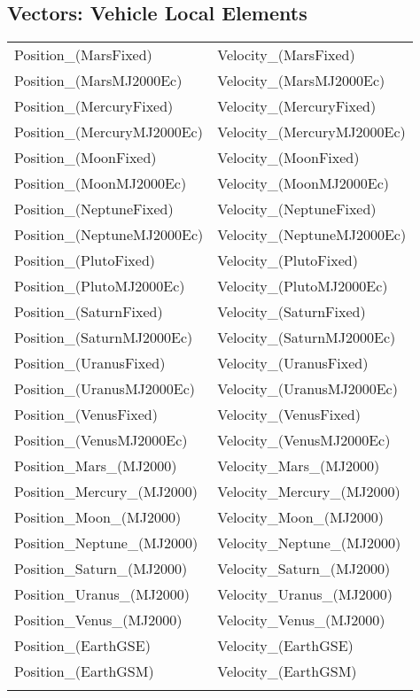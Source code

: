 \subsection{Vectors: Vehicle Local Elements}
\begin{table}[ht!]
\centering
    \begin{tabular}{ll}
    Position\_(MarsFixed) & Velocity\_(MarsFixed)\\
    Position\_(MarsMJ2000Ec) & Velocity\_(MarsMJ2000Ec)\\
    Position\_(MercuryFixed) & Velocity\_(MercuryFixed)\\
    Position\_(MercuryMJ2000Ec) & Velocity\_(MercuryMJ2000Ec)\\
    Position\_(MoonFixed) & Velocity\_(MoonFixed)\\
    Position\_(MoonMJ2000Ec) & Velocity\_(MoonMJ2000Ec)\\
    Position\_(NeptuneFixed) & Velocity\_(NeptuneFixed)\\
    Position\_(NeptuneMJ2000Ec) & Velocity\_(NeptuneMJ2000Ec)\\
    Position\_(PlutoFixed) & Velocity\_(PlutoFixed)\\
    Position\_(PlutoMJ2000Ec) & Velocity\_(PlutoMJ2000Ec)\\
    Position\_(SaturnFixed) & Velocity\_(SaturnFixed)\\
    Position\_(SaturnMJ2000Ec) & Velocity\_(SaturnMJ2000Ec)\\
    Position\_(UranusFixed) & Velocity\_(UranusFixed)\\
    Position\_(UranusMJ2000Ec) & Velocity\_(UranusMJ2000Ec)\\
    Position\_(VenusFixed) & Velocity\_(VenusFixed)\\
    Position\_(VenusMJ2000Ec) & Velocity\_(VenusMJ2000Ec)\\
    Position\_Mars\_(MJ2000) & Velocity\_Mars\_(MJ2000)\\
    Position\_Mercury\_(MJ2000) & Velocity\_Mercury\_(MJ2000)\\
    Position\_Moon\_(MJ2000) & Velocity\_Moon\_(MJ2000)\\
    Position\_Neptune\_(MJ2000) & Velocity\_Neptune\_(MJ2000)\\
    Position\_Saturn\_(MJ2000) & Velocity\_Saturn\_(MJ2000)\\
    Position\_Uranus\_(MJ2000) & Velocity\_Uranus\_(MJ2000)\\
    Position\_Venus\_(MJ2000) & Velocity\_Venus\_(MJ2000)\\
    Position\_(EarthGSE) & Velocity\_(EarthGSE)\\
    Position\_(EarthGSM) & Velocity\_(EarthGSM)\\
    \label{Table: AstroVehicleLocal}
\end{tabular}
\end{table}

